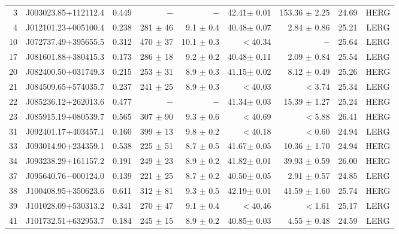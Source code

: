 \documentclass[twocolumn]{aastex62}
\begin{document}
\begin{table*}
\begin{minipage}{180mm}
{\begin{tabular}{@{} r c r r r r r c  c @{}}
3 & J003023.85+112112.4 &    0.449&     $-$	    &        $-$      	   &    42.41$\pm$      0.01 &   153.36 $\pm$     2.25&24.69&  HERG\\
4 & J012101.23+005100.4 &    0.238& 281 $\pm$  46&       9.1 $\pm$     0.4 &    40.48$\pm$      0.07 &     2.84 $\pm$     0.86&25.21&  LERG\\
10& J072737.49+395655.5 &    0.312& 470 $\pm$  37&      10.1 $\pm$     0.3 & $<$40.34                &          $-$           &25.64&  LERG\\
17& J081601.88+380415.3 &    0.173& 286 $\pm$  18&       9.2 $\pm$     0.2 &    40.48$\pm$      0.11 &     2.09 $\pm$     0.84&25.54&  LERG\\
20& J082400.50+031749.3 &    0.215& 253 $\pm$  31&       8.9 $\pm$     0.3 &    41.15$\pm$      0.02 &     8.12 $\pm$     0.49&25.26&  HERG\\
21& J084509.65+574035.7 &    0.237& 241 $\pm$  25&       8.9 $\pm$     0.3 & $<$40.03                &  $<$3.74               &25.34&  LERG\\
22& J085236.12+262013.6 &    0.477&     $-$	    &        $-$           &    41.34$\pm$      0.03 &    15.39 $\pm$     1.27&25.24&  HERG\\
23& J085915.19+080539.7 &    0.565& 307 $\pm$  90&       9.3 $\pm$     0.6 & $<$40.69                &  $<$5.88               &26.41&  HERG\\
31& J092401.17+403457.1 &    0.160& 399 $\pm$  13&       9.8 $\pm$     0.2 & $<$40.18                &  $<$0.60               &24.94&  LERG\\
33& J093014.90+234359.1 &    0.538& 225 $\pm$  51&       8.7 $\pm$     0.5 &    41.67$\pm$      0.05 &    10.36 $\pm$     1.70&24.94&  HERG\\
34& J093238.29+161157.2 &    0.191& 249 $\pm$  23&       8.9 $\pm$     0.2 &    41.82$\pm$      0.01 &    39.93 $\pm$     0.59&26.00&  HERG\\
37& J095640.76$-$000124.0 &  0.139& 221 $\pm$  25&       8.7 $\pm$     0.2 &    40.50$\pm$      0.05 &     2.91 $\pm$     0.57&24.85&  LERG\\
38& J100408.95+350623.6 &    0.611& 312 $\pm$  81&       9.3 $\pm$     0.5 &    42.19$\pm$      0.01 &    41.59 $\pm$     1.60&25.74&  HERG\\
39& J101028.09+530313.2 &    0.341& 270 $\pm$  47&       9.1 $\pm$     0.4 & $<$40.46                &  $<$1.61               &25.17&  LERG\\
41& J101732.51+632953.7 &    0.184& 245 $\pm$  15&       8.9 $\pm$     0.2 &    40.85$\pm$      0.03 &     4.55 $\pm$     0.48&24.59&  LERG\\

\end{tabular}}
\end{minipage}
\end{table*}
\end{document}
